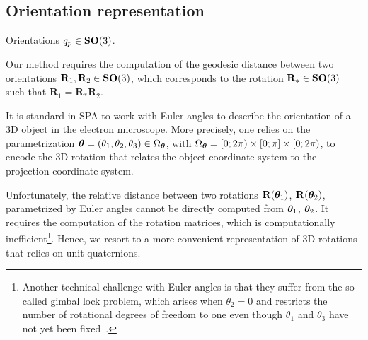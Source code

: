 \subsection{Orientation representation}\label{sec:method:orientation-representation}

 

Orientations $q_p \in \mathrm{\mathbf{SO}}(3)$.
 

Our method requires the computation of the geodesic distance between two orientations $\mathbf{R}_1, \mathbf{R}_2 \in \mathrm{\mathbf{SO}}(3)$, which corresponds to the rotation $\mathbf{R}_* \in \mathrm{\mathbf{SO}}(3)$ such that $\mathbf{R}_1 = \mathbf{R}_* \mathbf{R}_2$.

It is standard in SPA to work with Euler angles to describe the orientation of a 3D object in the electron microscope.
More precisely, one relies on the parametrization ${\boldsymbol{\theta}}=(\theta_1,\theta_2,\theta_3)\in\Omega_{\boldsymbol{\theta}}$, with $\Omega_{\boldsymbol{\theta}}=[0;2\pi)\times [0;\pi] \times [0;2\pi)$, to encode the 3D rotation that relates the object coordinate system to the projection coordinate system.

Unfortunately, the relative distance between two rotations $\mathbf{R}({\boldsymbol{\theta}}_1)$, $\mathbf{R}({\boldsymbol{\theta}}_2)$, parametrized by Euler angles cannot be directly computed from ${\boldsymbol{\theta}}_1$, ${\boldsymbol{\theta}}_2$.
It requires the computation of the rotation matrices, which is computationally inefficient\footnote{Another technical challenge with Euler angles is that they suffer from the so-called gimbal lock problem, which arises when $\theta_2=0$ and restricts the number of rotational degrees of freedom to one even though $\theta_1$ and $\theta_3$ have not yet been fixed~\cite{koks2006explorations}.}.
Hence, we resort to a more convenient representation of 3D rotations that relies on unit quaternions.

